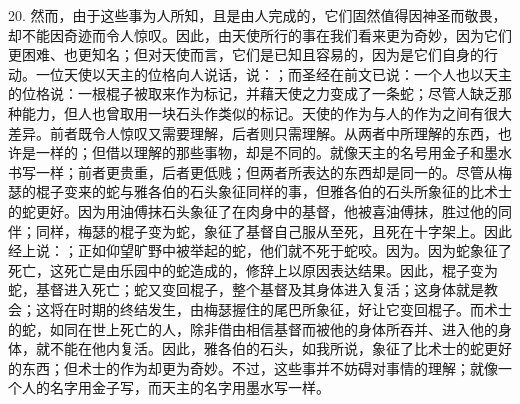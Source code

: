 20. 然而，由于这些事为人所知，且是由人完成的，它们固然值得因神圣而敬畏，却不能因奇迹而令人惊叹。因此，由天使所行的事在我们看来更为奇妙，因为它们更困难、也更知名；但对天使而言，它们是已知且容易的，因为是它们自身的行动。一位天使以天主的位格向人说话，说：；而圣经在前文已说：一个人也以天主的位格说：一根棍子被取来作为标记，并藉天使之力变成了一条蛇；尽管人缺乏那种能力，但人也曾取用一块石头作类似的标记。天使的作为与人的作为之间有很大差异。前者既令人惊叹又需要理解，后者则只需理解。从两者中所理解的东西，也许是一样的；但借以理解的那些事物，却是不同的。就像天主的名号用金子和墨水书写一样；前者更贵重，后者更低贱；但两者所表达的东西却是同一的。尽管从梅瑟的棍子变来的蛇与雅各伯的石头象征同样的事，但雅各伯的石头所象征的比术士的蛇更好。因为用油傅抹石头象征了在肉身中的基督，他被喜油傅抹，胜过他的同伴；同样，梅瑟的棍子变为蛇，象征了基督自己服从至死，且死在十字架上。因此经上说：；正如仰望旷野中被举起的蛇，他们就不死于蛇咬。因为。因为蛇象征了死亡，这死亡是由乐园中的蛇造成的，修辞上以原因表达结果。因此，棍子变为蛇，基督进入死亡；蛇又变回棍子，整个基督及其身体进入复活；这身体就是教会；这将在时期的终结发生，由梅瑟握住的尾巴所象征，好让它变回棍子。而术士的蛇，如同在世上死亡的人，除非借由相信基督而被他的身体所吞并、进入他的身体，就不能在他内复活。因此，雅各伯的石头，如我所说，象征了比术士的蛇更好的东西；但术士的作为却更为奇妙。不过，这些事并不妨碍对事情的理解；就像一个人的名字用金子写，而天主的名字用墨水写一样。\par

